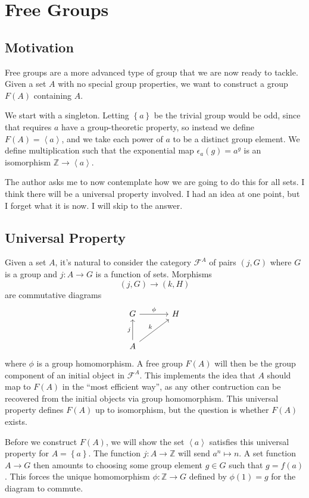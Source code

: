 \section{Free Groups}
\subsection{Motivation}
Free groups are a more advanced type of group that we are now ready to tackle. Given a set $A$ with no special group properties, we want to construct a group $F(A)$ containing $A$.

We start with a singleton. Letting $\left\{ a \right\} $ be the trivial group  would be odd, since that requires $a$ have a group-theoretic property, so instead we define $F(A)=\left\langle a \right\rangle $, and we take each power of $a$ to be a distinct group element. We define multiplication such that the exponential map $\epsilon_a(g)=a^g$ is an isomorphism $\mathbb{Z}\to \left\langle a \right\rangle $.

The author asks me to now contemplate how we are going to do this for all sets. I think there will be a universal property involved. I had an idea at one point, but I forget what it is now. I will skip to the answer.

\subsection{Universal Property}

Given a set $A$, it's natural to consider the category $\mathscr{F}^A$ of pairs $(j,G)$ where $G$ is a group and $j : A \to G$ is a function of sets. Morphisms
\[
	(j,G)\to (k,H)
\]
are commutative diagrams
\[\begin{tikzcd}[row sep=2.5em, column sep=3.5em]
	G\arrow[r,"\phi "]&H\\
	A\arrow[u, "j"]\arrow[ur, "k"]
\end{tikzcd}\]
where $\phi $ is a group homomorphism. A free group $F(A)$ will then be the group component of an initial object in $\mathscr{F} ^A$. This implements the idea that $A$ should map to $F(A)$ in the ``most efficient way'', as any other contruction can be recovered from the initial objects via group homomorphism. This universal property defines $F(A)$ up to isomorphism, but the question is whether $F(A)$ exists.

Before we construct $F(A)$, we will show the set $\left<a \right>$ satisfies this universal property for $A=\left\{ a \right\} $. The function $j : A \to \mathbb{Z}$ will send $a^n \mapsto n$. A set function $A\to G$ then amounts to choosing some group element $g\in G$ such that $g=f(a)$. This forces the unique homomorphism $\phi : \mathbb{Z} \to G$ defined by $\phi (1)=g$ for the diagram to commute.

